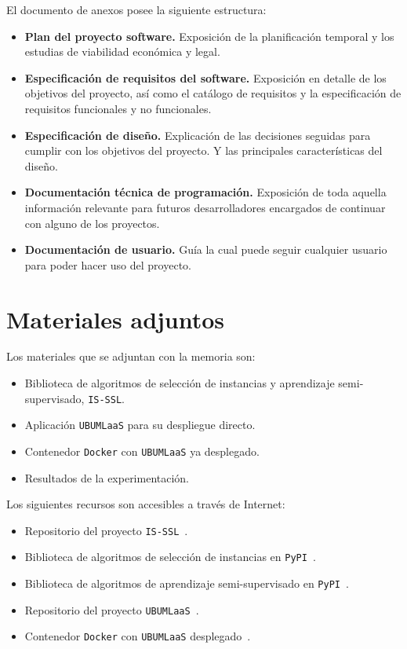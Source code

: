 El documento de anexos posee la siguiente estructura:
\begin{itemize}
\item \textbf{Plan del proyecto software.} Exposición de la planificación temporal y los estudias de viabilidad económica y legal.
\item \textbf{Especificación de requisitos del software.} Exposición en detalle de los objetivos del proyecto, así como el catálogo de requisitos y la especificación de requisitos funcionales y no funcionales.
\item \textbf{Especificación de diseño.} Explicación de las decisiones seguidas para cumplir con los objetivos del proyecto. Y las principales características del diseño.
\item \textbf{Documentación técnica de programación.} Exposición de toda aquella información relevante para futuros desarrolladores encargados de continuar con alguno de los proyectos.
\item \textbf{Documentación de usuario.} Guía la cual puede seguir cualquier usuario para poder hacer uso del proyecto.
\end{itemize}


\section{Materiales adjuntos}\label{materiales-adjuntos}
Los materiales que se adjuntan con la memoria son:
\begin{itemize}
\item Biblioteca de algoritmos de selección de instancias y aprendizaje semi-supervisado, \texttt{IS-SSL}.
\item Aplicación \texttt{UBUMLaaS} para su despliegue directo.
\item Contenedor \texttt{Docker} con \texttt{UBUMLaaS} ya desplegado.
\item Resultados de la experimentación.
\end{itemize}

Los siguientes recursos son accesibles a través de Internet:
\begin{itemize}
\item Repositorio del proyecto \texttt{IS-SSL}~\cite{ISSSLRepo}.
\item Biblioteca de algoritmos de selección de instancias en \texttt{PyPI}~\cite{ISPyPI}.
\item Biblioteca de  algoritmos de aprendizaje semi-supervisado en \texttt{PyPI}~\cite{SSLPyPI}.
\item Repositorio del proyecto \texttt{UBUMLaaS}~\cite{UBUMLaaSRepo}.
\item Contenedor \texttt{Docker} con \texttt{UBUMLaaS} desplegado~\cite{UBUMLaaSDocker}.
\end{itemize}
